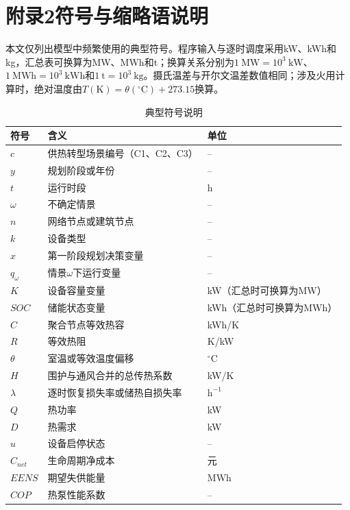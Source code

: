 \documentclass[12pt,a4paper]{article}
\begin{document}


\section*{附录2\quad 符号与缩略语说明}

本文仅列出模型中频繁使用的典型符号。程序输入与逐时调度采用kW、kWh和kg，汇总表可换算为MW、MWh和t；换算关系分别为$1~\mathrm{MW}=10^3~\mathrm{kW}$、$1~\mathrm{MWh}=10^3~\mathrm{kWh}$和$1~\mathrm{t}=10^3~\mathrm{kg}$。摄氏温差与开尔文温差数值相同；涉及火用计算时，绝对温度由$T(\mathrm K)=\theta({}^{\circ}\mathrm C)+273.15$换算。

\begin{table}[H]
\centering
\caption{典型符号说明}
\begin{tabular}{p{}p{}p{}}
\toprule
符号 & 含义 & 单位\\
\midrule
$c$ & 供热转型场景编号（C1、C2、C3） & --\\
$y$ & 规划阶段或年份 & --\\
$t$ & 运行时段 & h\\
$\omega$ & 不确定情景 & --\\
$n$ & 网络节点或建筑节点 & --\\
$k$ & 设备类型 & --\\
$x$ & 第一阶段规划决策变量 & --\\
$q_\omega$ & 情景$\omega$下运行变量 & --\\
$K$ & 设备容量变量 & kW（汇总时可换算为MW）\\
$SOC$ & 储能状态变量 & kWh（汇总时可换算为MWh）\\
$C$ & 聚合节点等效热容 & kWh/K\\
$R$ & 等效热阻 & K/kW\\
$\theta$ & 室温或等效温度偏移 & $^{\circ}$C\\
$H$ & 围护与通风合并的总传热系数 & kW/K\\
$\lambda$ & 逐时恢复损失率或储热自损失率 & $\mathrm h^{-1}$\\
$Q$ & 热功率 & kW\\
$D$ & 热需求 & kW\\
$u$ & 设备启停状态 & --\\
$C_{net}$ & 生命周期净成本 & 元\\
$EENS$ & 期望失供能量 & MWh\\
$COP$ & 热泵性能系数 & --\\
\bottomrule
\end{tabular}
\end{table}
\end{document}
